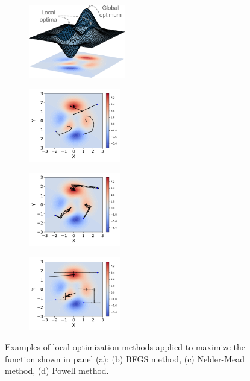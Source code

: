 \begin{figure}[hb]
\begin{subfigure}[b]{\linewidth}
\centering
\includegraphics[height=3.2cm]{images/part1/opt/example_3d_en.png}
\caption{}
\end{subfigure}
\begin{subfigure}[b]{.33\linewidth}
\includegraphics[height=3.2cm]{images/part1/opt/example_bfgs.png}
\caption{}
\end{subfigure}%
\begin{subfigure}[b]{.33\linewidth}
\includegraphics[height=3.2cm]{images/part1/opt/example_nelder_mead.png}
\caption{}
\end{subfigure}%
\begin{subfigure}[b]{.33\linewidth}
\includegraphics[height=3.2cm]{images/part1/opt/example_powell.png}
\caption{}
\end{subfigure}
\caption{Examples of local optimization methods applied to maximize the function shown in panel (a): (b) BFGS method, (c) Nelder-Mead method, (d) Powell method.}
\end{figure}

